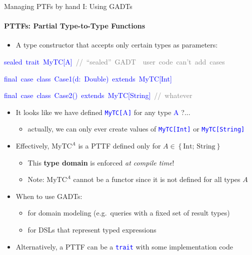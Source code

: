 \documentclass[english]{beamer}
\newenvironment{lyxcode}
   {\par\begin{list}{}{
     \setlength{\rightmargin}{\leftmargin}
     \setlength{\listparindent}{0pt}%
     \raggedright
     \setlength{\itemsep}{0pt}
     \setlength{\parsep}{0pt}
     \normalfont\ttfamily}%
    \def\{{\char`\{}
    \def\}{\char`\}}
    \def\textasciitilde{\char`\~}
    \item[]}
   {\end{list}}
\begin{document}
\begin{frame}{Managing PTFs by hand I: Using GADTs}


\framesubtitle{PTTFs: Partial Type-to-Type Functions}
\begin{itemize}
\item A type constructor that accepts only certain types as parameters:
\end{itemize}
\begin{lyxcode}
\textcolor{blue}{\footnotesize{}sealed~trait~MyTC{[}A{]}~}\textrm{\textcolor{gray}{\footnotesize{}//~``sealed''~GADT~\textendash{}~user~code~can't~add~cases}}{\footnotesize \par}

\textcolor{blue}{\footnotesize{}final~case~class~Case1(d:~Double)~extends~MyTC{[}Int{]}}{\footnotesize \par}

\textcolor{blue}{\footnotesize{}final~case~class~Case2()~extends~MyTC{[}String{]}}\textrm{\textcolor{gray}{\footnotesize{}~//~whatever}}{\footnotesize \par}
\end{lyxcode}
\begin{itemize}
\item It looks like we have defined \texttt{\textcolor{blue}{\footnotesize{}MyTC{[}}}\textcolor{blue}{\footnotesize{}A}\texttt{\textcolor{blue}{\footnotesize{}{]}}}
for any type \textcolor{blue}{\footnotesize{}A} ?...
\begin{itemize}
\item actually, we can only ever create values of \texttt{\textcolor{blue}{\footnotesize{}MyTC{[}Int{]}}}
or \texttt{\textcolor{blue}{\footnotesize{}MyTC{[}String{]}}}{\footnotesize \par}
\end{itemize}
\item Effectively, $\text{MyTC}^{A}$ is a PTTF defined only for $A\in\left\{ \text{Int};\,\text{String}\right\} $
\begin{itemize}
\item This \textbf{type domain} is enforced \emph{at compile time}!
\item Note: $\text{MyTC}^{A}$ cannot be a functor since it is not defined
for all types $A$
\end{itemize}
\item When to use GADTs:
\begin{itemize}
\item for domain modeling (e.g.\ queries with a fixed set of result types)
\item for DSLs that represent typed expressions
\end{itemize}
\item Alternatively, a PTTF can be a \texttt{\textcolor{blue}{\footnotesize{}trait}}
with some implementation code
\end{itemize}
\end{frame}
\end{document}
